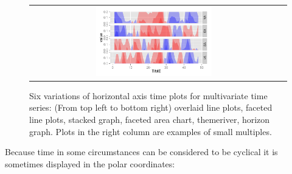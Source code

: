 \documentclass[12pt]{article}
\begin{document}
\begin{itemize}
\begin{center}
\begin{figure}[htp]
\begin{centering}
\begin{tabular}{cc}
\includegraphics[width=0.48\textwidth]{graph/pipeline-02-horizon}
\end{tabular}
\end{centering}
\caption{\label{fig:horizontal-axis} Six variations of horizontal axis time plots for multivariate
time series: (From top left to bottom right) overlaid line plots, faceted line plots,  stacked graph, faceted area chart, themeriver, horizon graph. Plots in the right column are examples of small multiples. }
\end{figure}
\end{center}

\end{itemize}

%
%

Because time in some circumstances can be considered to be cyclical it is sometimes displayed in the polar coordinates:

\end{document}
